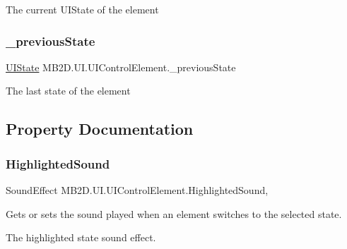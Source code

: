 The current U\+I\+State of the element 

\hypertarget{class_m_b2_d_1_1_u_i_1_1_u_i_control_element_a3a1c1743b02d8d2daa00231d5bb41067}{}\label{class_m_b2_d_1_1_u_i_1_1_u_i_control_element_a3a1c1743b02d8d2daa00231d5bb41067} 
\subsubsection{\texorpdfstring{\+\_\+previous\+State}{\_previousState}}
{\footnotesize\ttfamily \hyperlink{namespace_m_b2_d_1_1_u_i_a3d5fed7e80959a1444165894dfd9e75b}{U\+I\+State} M\+B2\+D.\+U\+I.\+U\+I\+Control\+Element.\+\_\+previous\+State\hspace{0.3cm}{\ttfamily [protected]}}



The last state of the element 



\subsection{Property Documentation}
\hypertarget{class_m_b2_d_1_1_u_i_1_1_u_i_control_element_abc0d689a5a22fe884d243f25141df360}{}\label{class_m_b2_d_1_1_u_i_1_1_u_i_control_element_abc0d689a5a22fe884d243f25141df360} 
\subsubsection{\texorpdfstring{Highlighted\+Sound}{HighlightedSound}}
{\footnotesize\ttfamily Sound\+Effect M\+B2\+D.\+U\+I.\+U\+I\+Control\+Element.\+Highlighted\+Sound\hspace{0.3cm}{\ttfamily [get]}, {\ttfamily [set]}}



Gets or sets the sound played when an element switches to the selected state. 

The highlighted state sound effect.\hypertarget{class_m_b2_d_1_1_u_i_1_1_u_i_control_element_aab215aee6dcf8827149dbfcb3721db89}{}\label{class_m_b2_d_1_1_u_i_1_1_u_i_control_element_aab215aee6dcf8827149dbfcb3721db89} 
